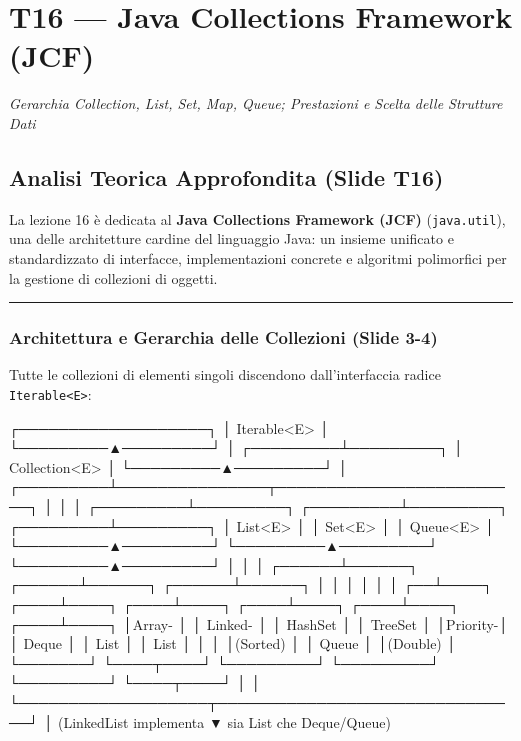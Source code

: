 \documentclass[11pt,a4paper,oneside]{report}
\newcommand{\passthrough}[1]{#1}
\begin{document}
\newpage
\chapter[T16 --- Java Collections Framework (JCF)]{T16 --- Java Collections Framework (JCF)}
\label{chap:t16}

{\small\sffamily\color{accentblue!80!black}\textit{Gerarchia Collection, List, Set, Map, Queue; Prestazioni e Scelta delle Strutture Dati}}

\vspace{0.8em}

\section{Analisi Teorica Approfondita (Slide
T16)}\label{chap15_analisi-teorica-approfondita-slide-t16}

La lezione 16 è dedicata al \textbf{Java Collections Framework (JCF)}
(\passthrough{\lstinline!java.util!}), una delle architetture cardine
del linguaggio Java: un insieme unificato e standardizzato di
interfacce, implementazioni concrete e algoritmi polimorfici per la
gestione di collezioni di oggetti.

\begin{center}\rule{0.5\linewidth}{0.5pt}\end{center}

\subsection{Architettura e Gerarchia delle Collezioni (Slide
3-4)}\label{chap15_architettura-e-gerarchia-delle-collezioni-slide-3-4}

Tutte le collezioni di elementi singoli discendono dall'interfaccia
radice \passthrough{\lstinline!Iterable<E>!}:

\needspace{7cm}
\begin{asciibox}
┌───────────────────┐
│    Iterable<E>    │
└─────────▲─────────┘
          │
┌─────────┴─────────┐
│   Collection<E>   │
└─────────▲─────────┘
          │
┌─────────┴───────────────┬─────────────────────────┐
│                         │                         │
┌─────────┴─────────┐     ┌─────────┴─────────┐     ┌─────────┴─────────┐
│      List<E>      │     │      Set<E>       │     │     Queue<E>      │
└─────────▲─────────┘     └─────────▲─────────┘     └─────────▲─────────┘
          │                         │                         │
   ┌──────┴──────┐           ┌──────┴──────┐           ┌──────┴──────┐
   │             │           │             │           │             │
┌──┴────┐   ┌────┴────┐ ┌────┴────┐   ┌────┴────┐ ┌────┴────┐   ┌────┴────┐
│Array- │   │ Linked- │ │ HashSet │   │ TreeSet │ │Priority-│   │  Deque  │
│ List  │   │  List   │ │         │   │(Sorted) │ │  Queue  │   │(Double) │
└───────┘   └────┬────┘ └─────────┘   └─────────┘ └─────────┘   └────┬────┘
                 │                                                   │
                 └───────────────────┬───────────────────────────────┘
                                     │ (LinkedList implementa
                                     ▼  sia List che Deque/Queue)
\end{asciibox}
\end{document}
